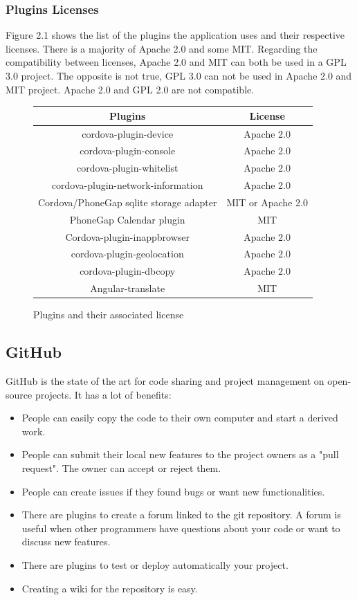 \documentclass{eplmastersthesis}
\begin{document}
\subsubsection{Plugins Licenses}
Figure 2.1 shows the list of the plugins the application uses and their respective licenses. There is a majority of Apache 2.0 and some MIT. Regarding the compatibility between licenses, Apache 2.0 and MIT can both be used in a GPL 3.0 project. The opposite is not true, GPL 3.0 can not be used in Apache 2.0 and MIT project. Apache 2.0 and GPL 2.0 are not compatible. 

\begin{figure}[H]
\begin{center}
\begin{tabular}{c|c}
Plugins & License\\
\hline
cordova-plugin-device & Apache 2.0\\
cordova-plugin-console & Apache 2.0\\
cordova-plugin-whitelist & Apache 2.0\\
cordova-plugin-network-information & Apache 2.0\\
Cordova/PhoneGap sqlite storage adapter & MIT or Apache 2.0\\
PhoneGap Calendar plugin & MIT\\
Cordova-plugin-inappbrowser & Apache 2.0\\
cordova-plugin-geolocation & Apache 2.0\\
cordova-plugin-dbcopy & Apache 2.0\\
Angular-translate & MIT \\
\end{tabular}
\end{center}
\caption{Plugins and their associated license}
\end{figure}
\subsection{GitHub}
GitHub is the state of the art for code sharing and project management on open-source projects. It has a lot of benefits:
\begin{itemize}
\item People can easily copy the code to their own computer and start a derived work. 
\item People can submit their local new features to the project owners as a "pull request". The owner can accept or reject them.
\item People can create issues if they found bugs or want new functionalities. 
\item There are plugins to create a forum linked to the git repository. A forum is useful when other programmers have questions about your code or want to discuss new features.
\item There are plugins to test or deploy automatically your project.
\item Creating a wiki for the repository is easy.
\end{itemize}
\end{document}

